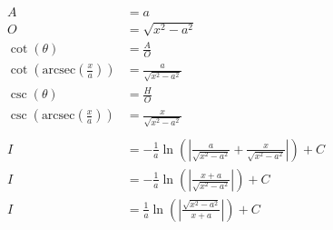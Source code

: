 \documentclass[12pt]{article}
\begin{document}
\begin{align}
    A                                                      & = a                                                                                                                                                           \\
    O                                                      & = \sqrt{x^2-a^2}                                                                                                                                              \\
    \cot(\theta)                                           & = \frac{A}{O}                                                                                                                                                 \\
    \cot\left(\text{arcsec}\left(\frac{x}{a}\right)\right) & = \frac{a}{\sqrt{x^2-a^2}}                                                                                                                                    \\
    \csc(\theta)                                           & = \frac{H}{O}                                                                                                                                                 \\
    \csc\left(\text{arcsec}\left(\frac{x}{a}\right)\right) & = \frac{x}{\sqrt{x^2-a^2}}                                                                                                                                    \\
    \nonumber                                                                                                                                                                                                              \\
    I                                                      & = -\frac{1}{a} \ln\left(\left|\frac{a}{\sqrt{x^2-a^2}}+\frac{x}{\sqrt{x^2-a^2}}\right|\right) + C                                                             \\
    I                                                      & = -\frac{1}{a} \ln\left(\left|\frac{x+a}{\sqrt{x^2-a^2}}\right|\right) + C                                                                                    \\
    I                                                      & = \frac{1}{a} \ln\left(\left|\frac{\sqrt{x^2-a^2}}{x+a}\right|\right) + C                                                                                     \\

\end{align}
\end{document}
